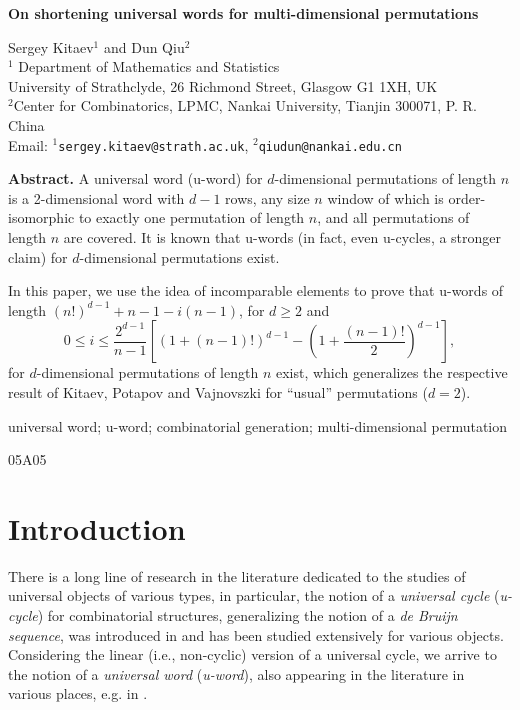\documentclass[12pt]{article}
\begin{document}
\begin{center}
{\large \bf  On shortening universal words for multi-dimensional permutations}
\end{center}


\begin{center}
Sergey Kitaev$^{1}$ and Dun Qiu$^{2}$\\[6pt]

$^{1}$ Department of Mathematics and Statistics \\
University of Strathclyde, 26 Richmond Street, Glasgow G1 1XH, UK\\[6pt]

$^{2}$Center for Combinatorics, LPMC, Nankai University, Tianjin 300071, P. R. China \\[6pt]

Email: $^{1}${\tt sergey.kitaev@strath.ac.uk},
           $^{2}${\tt qiudun@nankai.edu.cn}
\end{center}


\noindent\textbf{Abstract.} A universal word (u-word) for $d$-dimensional permutations of length $n$ is a 2-dimensional word with $d-1$ rows, any size $n$ window of which is order-isomorphic to exactly one permutation of length $n$, and all permutations of length $n$ are covered. It is known that u-words (in fact, even u-cycles, a stronger claim) for $d$-dimensional permutations exist. 

In this paper, we use the idea of incomparable elements to prove that u-words of length $(n!)^{d-1}+n-1-i(n-1)$, for $d\geq 2$ and  $$0\leq i\leq \frac{2^{d-1}}{n-1}\left[(1+(n-1)!)^{d-1}-\left(1+\frac{(n-1)!}{2}\right)^{d-1}\right],$$ for $d$-dimensional permutations of length $n$ exist, which generalizes the respective result of Kitaev, Potapov and Vajnovszki for ``usual'' permutations ($d=2$). 


  universal word; u-word; combinatorial generation; multi-dimensional permutation

  05A05


\section{Introduction}\label{intro}

There is a long line of research in the literature dedicated to the studies of universal objects of various types, in particular, the notion of a {\em universal cycle} ({\em u-cycle}) for combinatorial structures, generalizing the notion of a {\em de Bruijn sequence}, was introduced in \cite{CDG1992} and has been studied extensively for various objects. Considering the linear (i.e., non-cyclic) version of a universal cycle, we arrive to the notion of a {\em universal word} ({\em u-word}), also appearing in the literature in various places, e.g. in \cite{KPV}.
\end{document}
